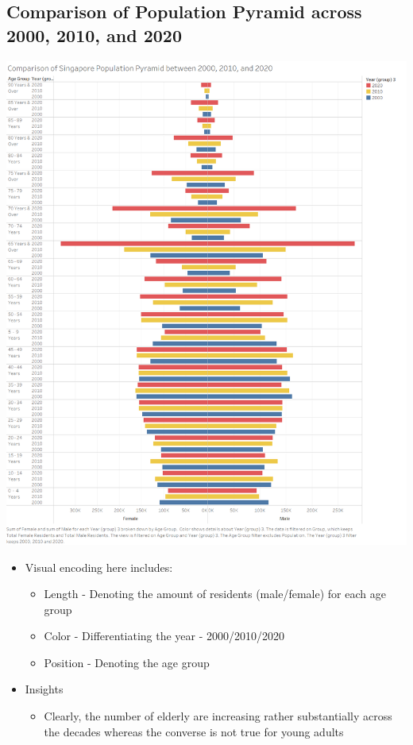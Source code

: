 \documentclass[a4paper, 11pt]{article}
\begin{document}
\subsection{Comparison of Population Pyramid across 2000, 2010, and 2020}
\label{sec:org340e1f9}

\begin{center}
\includegraphics[width=.9\linewidth]{./charts/Pyramid.png}
\end{center}

\begin{itemize}
\item Visual encoding here includes:
\begin{itemize}
\item Length - Denoting the amount of residents (male/female) for each age group
\item Color - Differentiating the year - 2000/2010/2020
\item Position - Denoting the age group
\end{itemize}
\item Insights
\begin{itemize}
\item Clearly, the number of elderly are increasing rather substantially across the decades whereas the converse is not true for young adults
\end{itemize}
\end{itemize}
\end{document}
